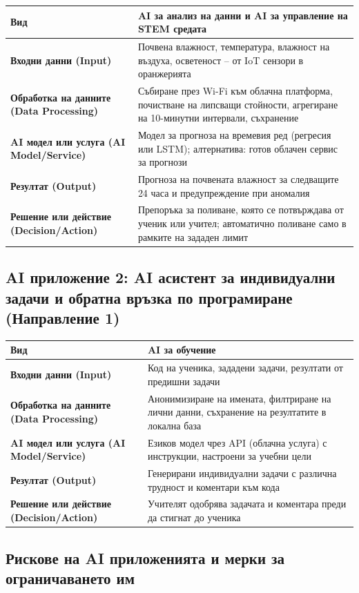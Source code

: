 \documentclass[11pt,a4paper]{article}
\begin{document}
\begin{tabularx}{\textwidth}{@{}>{\bfseries}lX@{}}
\toprule
Вид & AI за анализ на данни и AI за управление на STEM средата \\
\midrule
Входни данни (Input) & Почвена влажност, температура, влажност на въздуха, осветеност – от IoT сензори в оранжерията \\
Обработка на данните (Data Processing) & Събиране през Wi-Fi към облачна платформа, почистване на липсващи стойности, агрегиране на 10-минутни интервали, съхранение \\
AI модел или услуга (AI Model/Service) & Модел за прогноза на времевия ред (регресия или LSTM); алтернатива: готов облачен сервис за прогнози \\
Резултат (Output) & Прогноза на почвената влажност за следващите 24 часа и предупреждение при аномалия \\
Решение или действие (Decision/Action) & Препоръка за поливане, която се потвърждава от ученик или учител; автоматично поливане само в рамките на зададен лимит \\
\bottomrule
\end{tabularx}

\subsection{AI приложение 2: AI асистент за индивидуални задачи и обратна връзка по програмиране (Направление 1)}

\begin{tabularx}{\textwidth}{@{}>{\bfseries}lX@{}}
\toprule
Вид & AI за обучение \\
\midrule
Входни данни (Input) & Код на ученика, зададени задачи, резултати от предишни задачи \\
Обработка на данните (Data Processing) & Анонимизиране на имената, филтриране на лични данни, съхранение на резултатите в локална база \\
AI модел или услуга (AI Model/Service) & Езиков модел чрез API (облачна услуга) с инструкции, настроени за учебни цели \\
Резултат (Output) & Генерирани индивидуални задачи с различна трудност и коментари към кода \\
Решение или действие (Decision/Action) & Учителят одобрява задачата и коментара преди да стигнат до ученика \\
\bottomrule
\end{tabularx}

\subsection{Рискове на AI приложенията и мерки за ограничаването им}
\end{document}
